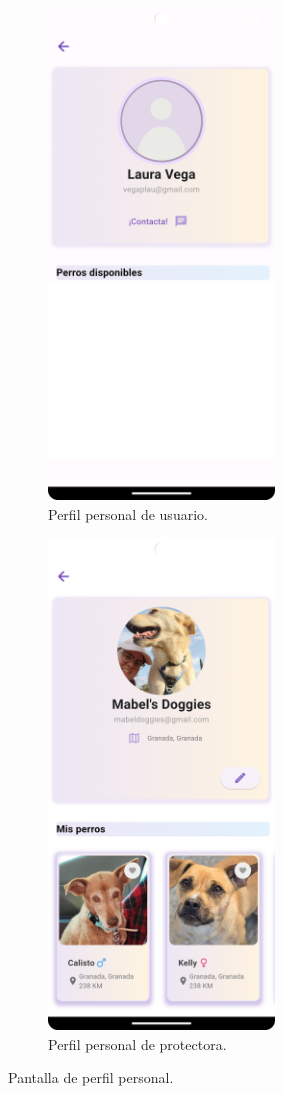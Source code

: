 \documentclass[a4paper, 12pt]{article}
\begin{document}
\begin{figure}[H]
   	\begin{subfigure}{0.48\textwidth}
		\begin{center}
			{\includegraphics[width=6cm]{app/UserProfile.png}\par}
			\caption{Perfil personal de usuario.}
		\end{center}  
	\end{subfigure}\hfill
   	\begin{subfigure}{0.48\textwidth}
		\begin{center}
			{\includegraphics[width=6cm]{app/CompanyProfile.png}\par}
			\caption{Perfil personal de protectora.}
		\end{center}  
	\end{subfigure}\hfill
	\caption{Pantalla de perfil personal.}
\end{figure}
\end{document}
